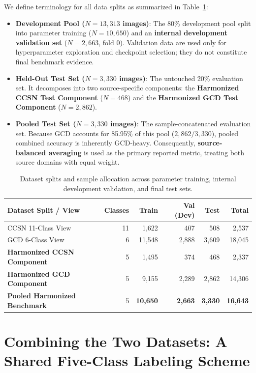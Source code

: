 \documentclass[11pt,a4paper]{article}
\begin{document}
We define terminology for all data splits as summarized in Table~\ref{tab:dataset_splits}:
\begin{itemize}
    \item \textbf{Development Pool ($N=13,313$ images)}: The 80\% development pool split into parameter training ($N=10,650$) and an \textbf{internal development validation set} ($N=2,663$, fold 0). Validation data are used only for hyperparameter exploration and checkpoint selection; they do not constitute final benchmark evidence.
    \item \textbf{Held-Out Test Set ($N=3,330$ images)}: The untouched 20\% evaluation set. It decomposes into two source-specific components: the \textbf{Harmonized CCSN Test Component} ($N=468$) and the \textbf{Harmonized GCD Test Component} ($N=2,862$).
    \item \textbf{Pooled Test Set ($N=3,330$ images)}: The sample-concatenated evaluation set. Because GCD accounts for 85.95\% of this pool ($2,862 / 3,330$), pooled combined accuracy is inherently GCD-heavy. Consequently, \textbf{source-balanced averaging} is used as the primary reported metric, treating both source domains with equal weight.
\end{itemize}

\begin{table}[!htbp]
\centering
\begin{tabular}{lrrrrr}
\toprule
\textbf{Dataset Split / View} & \textbf{Classes} & \textbf{Train} & \textbf{Val (Dev)} & \textbf{Test} & \textbf{Total} \\
\midrule
CCSN 11-Class View & 11 & 1,622 & 407 & 508 & 2,537 \\
GCD 6-Class View & 6 & 11,548 & 2,888 & 3,609 & 18,045 \\
\midrule
\textbf{Harmonized CCSN Component} & 5 & 1,495 & 374 & 468 & 2,337 \\
\textbf{Harmonized GCD Component} & 5 & 9,155 & 2,289 & 2,862 & 14,306 \\
\midrule
\textbf{Pooled Harmonized Benchmark} & 5 & \textbf{10,650} & \textbf{2,663} & \textbf{3,330} & \textbf{16,643} \\
\bottomrule
\end{tabular}
\caption{Dataset splits and sample allocation across parameter training, internal development validation, and final test sets.}
\label{tab:dataset_splits}
\end{table}

\section{Combining the Two Datasets: A Shared Five-Class Labeling Scheme}
\label{sec:taxonomy}
\end{document}
